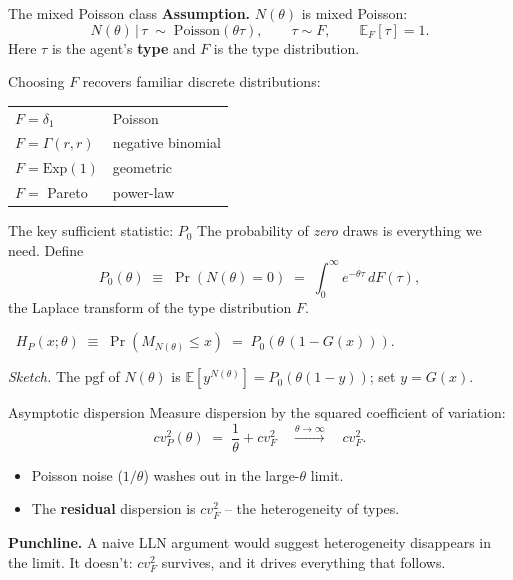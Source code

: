 \documentclass[aspectratio=169,xcolor=dvipsnames]{beamer}
\begin{document}
\begin{frame}{The mixed Poisson class}
    \textbf{Assumption.} $N(\theta)$ is mixed Poisson:
    \[
        N(\theta)\,\big|\,\tau \;\sim\; \mathrm{Poisson}(\theta\tau),\qquad \tau\sim F,\qquad \mathbb{E}_F[\tau]=1.
    \]
    Here $\tau$ is the agent's \textbf{type} and $F$ is the type distribution.

    \vspace{3mm}
    Choosing $F$ recovers familiar discrete distributions:
    \begin{center}
        \begin{tabular}{ll}
            $F = \delta_1$ & Poisson \\
            $F = \Gamma(r,r)$ & negative binomial \\
            $F = \text{Exp}(1)$ & geometric \\
            $F = $ Pareto & power-law
        \end{tabular}
    \end{center}
\end{frame}

\begin{frame}{The key sufficient statistic: $P_0$}
    The probability of \emph{zero} draws is everything we need.
    Define
    \[
        P_0(\theta) \;\equiv\; \Pr(N(\theta)=0) \;=\; \int_0^\infty e^{-\theta\tau}\,dF(\tau),
    \]
    the Laplace transform of the type distribution $F$.

    \vspace{3mm}
    \begin{lemma}
        $\;\;H_P(x;\theta) \;\equiv\; \Pr(M_{N(\theta)}\le x) \;=\; P_0\!\left(\theta\,(1-G(x))\right).$
    \end{lemma}

    \vspace{3mm}
    \emph{Sketch.} The pgf of $N(\theta)$ is $\mathbb{E}[y^{N(\theta)}] = P_0(\theta(1-y))$; set $y=G(x)$.
\end{frame}

\begin{frame}{Asymptotic dispersion}
    Measure dispersion by the squared coefficient of variation:
    \[
        cv^2_P(\theta) \;=\; \frac{1}{\theta} + cv^2_F
        \quad\xrightarrow{\theta\to\infty}\quad
        cv^2_F.
    \]
    \begin{itemize}
        \item Poisson noise ($1/\theta$) washes out in the large-$\theta$ limit.
        \item The \textbf{residual} dispersion is $cv^2_F$ -- the heterogeneity of types.
    \end{itemize}
    \vspace{3mm}

    \textbf{Punchline.} A naive LLN argument would suggest heterogeneity disappears in the limit. It doesn't: $cv^2_F$ survives, and it drives everything that follows.
\end{frame}
\end{document}
